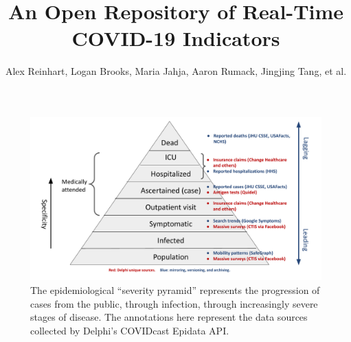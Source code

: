 \documentclass[9pt,twoside,lineno]{pnas-new}
\title{An Open Repository of Real-Time COVID-19 Indicators}
\author{Alex Reinhart, Logan Brooks, Maria Jahja, Aaron Rumack, Jingjing Tang,
  et al.}
\begin{document}
\maketitle

\begin{figure}
\includegraphics[width=\textwidth]{fig/severity-pyramid.pdf}
\caption{The epidemiological ``severity pyramid'' represents the progression of
cases from the public, through infection, through increasingly severe stages of
disease. The annotations here represent the data sources collected by Delphi's
COVIDcast Epidata API.}
\end{figure}

\clearpage
\end{document}

